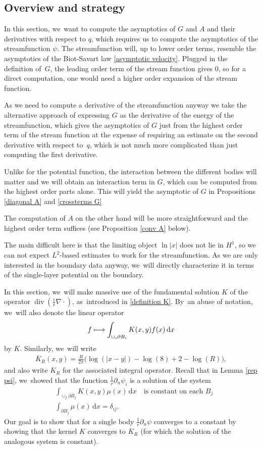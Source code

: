 \documentclass[10pt]{amsart}
\newcommand\mto{\mathchoice{\longmapsto}{\mapsto}{\mapsto}{\mapsto}}
\theoremstyle{definition}
\renewcommand{\div}{\operatorname{div}}
\newcommand\eq{=}
\newcommand\dd{\,\mathrm{d}}
\newcommand\dx{\dd x}
\let\de\partial
\begin{document}
\subsection{Overview and strategy}
In this section, we~want to compute the asymptotics of $G$ and $A$ and their derivatives with respect to $q$, which requires us to compute the asymptotics of the streamfunction $\psi$. The streamfunction will, up to lower order terms, resemble the asymptotics of the Biot-Savart law \eqref{asymptotic velocity}. Plugged in the definition of~$G$, the leading order term of the stream function gives $0$, so for a direct computation, one would need a higher order expansion of the stream function.

As we need to compute a derivative of the streamfunction anyway we take the alternative approach of expressing $G$ as the derivative of the energy of the streamfunction, which gives the asymptotics of $G$ just from the highest order term of the stream function at the expense of requiring an estimate on the second derivative with respect to~$q$, which is not much more complicated than just computing the first derivative.

Unlike for the potential function, the interaction between the different bodies will matter and we will obtain an interaction term in $G$, which can be computed from the highest order parts alone. This will yield the asymptotic of $G$ in Propositions \ref{diagonal A} and \ref{crossterms G}

The computation of $A$ on the other hand will be more straightforward and the highest order term suffices (see Proposition \ref{conv A} below).

The main difficult here is that the limiting object $\ln|x|$ does not lie in $H^1$, so we can not expect $L^2$-based estimates to work for the streamfunction. As we are only interested in the boundary data anyway, we~will directly characterize it in terms of the single-layer potential on the boundary.

In this section, we~will make massive use of the fundamental solution $K$ of the operator $\div(\frac{1}{r}\nabla\cdot)$, as~introduced in \eqref{definition K}. By~an abuse of notation, we~will also denote the linear operator
\begin{align*}
f\mto \int_{\cup_i\de B_i}K(x,y)f(x)\dx
\end{align*}
by $K$. Similarly, we~will write
\begin{align*}\overline{K}_R(x,y)=\frac{R}{2\pi}\bigl(\log(|x-y|)-\log(8)+2-\log(R)\bigr),
\end{align*}
and also write $\overline{K}_R$ for the associated integral operator.
Recall that in Lemma \ref{rep psi}, we~showed that the function $\frac{1}{r}\de_n \psi_i$ is a solution of the system
\begin{align}
&\int_{\cup_j\de B_j}K(x,y)\mu(x)\dx \quad\text{is constant on each $B_j$}\label{K eq 1}\\
&\int_{\de B_j}\mu(x)\dx\eq\delta_{ij}.\label{K eq 2}
\end{align}
Our goal is to show that for a single body $\frac{1}{r}\de_n\psi$ converges to a constant by showing that the kernel $K$ converges to $\overline{K}_R$ (for which the solution of the analogous system is constant).
\end{document}
